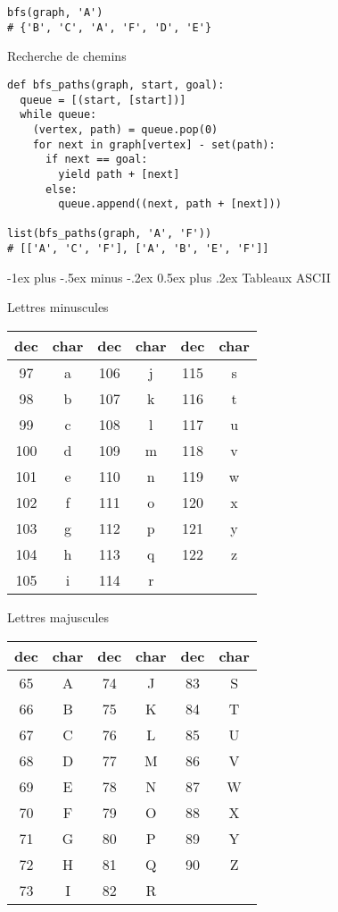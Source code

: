 \documentclass[10pt,landscape]{article}
\makeatletter
\renewcommand{\section}{\@startsection{section}{1}{0mm}%
                                {-1ex plus -.5ex minus -.2ex}%
                                {0.5ex plus .2ex}%
                                {\normalfont\large\bfseries}}
\makeatother
\begin{document}
\begin{multicols}{3}
\begin{verbatim}
bfs(graph, 'A')
# {'B', 'C', 'A', 'F', 'D', 'E'}
\end{verbatim}

Recherche de chemins

\begin{verbatim}
def bfs_paths(graph, start, goal):
  queue = [(start, [start])]
  while queue:
    (vertex, path) = queue.pop(0)
    for next in graph[vertex] - set(path):
      if next == goal:
        yield path + [next]
      else:
        queue.append((next, path + [next]))

list(bfs_paths(graph, 'A', 'F')) 
# [['A', 'C', 'F'], ['A', 'B', 'E', 'F']]
\end{verbatim}

\section{Tableaux ASCII}

Lettres minuscules

\begin{tabular}{c|c||c|c||c|c}
\hline
dec & char & dec & char & dec & char\\
\hline
97  & a & 106 & j & 115 & s \\
98  & b & 107 & k & 116 & t \\
99  & c & 108 & l & 117 & u \\
100 & d & 109 & m & 118 & v \\
101 & e & 110 & n & 119 & w \\
102 & f & 111 & o & 120 & x \\
103 & g & 112 & p & 121 & y \\
104 & h & 113 & q & 122 & z \\
105 & i & 114 & r &     &   \\
\hline
\end{tabular}

Lettres majuscules

\begin{tabular}{c|c||c|c||c|c}
\hline
dec & char & dec & char & dec & char\\
\hline
65 & A & 74 & J & 83 & S \\
66 & B & 75 & K & 84 & T \\
67 & C & 76 & L & 85 & U \\
68 & D & 77 & M & 86 & V \\
69 & E & 78 & N & 87 & W \\
70 & F & 79 & O & 88 & X \\
71 & G & 80 & P & 89 & Y \\
72 & H & 81 & Q & 90 & Z \\
73 & I & 82 & R &     &   \\


\end{tabular}
\end{multicols}
\end{document}
